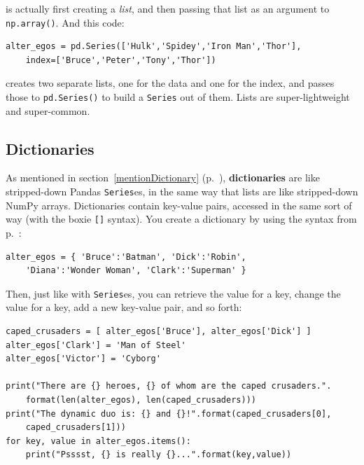 is actually first creating a \textit{list}, and then passing that list as an
argument to \texttt{np.array()}. And this code:


\begin{Verbatim}[fontsize=\footnotesize,samepage=true,frame=single,framesep=3mm]
alter_egos = pd.Series(['Hulk','Spidey','Iron Man','Thor'],
    index=['Bruce','Peter','Tony','Thor'])
\end{Verbatim}

creates two separate lists, one for the data and one for the index, and passes
those to \texttt{pd.Series()} to build a \texttt{Series} out of them. Lists are
super-lightweight and super-common.

\subsection{Dictionaries}


As mentioned in section~\ref{mentionDictionary}
(p.~\pageref{mentionDictionary}), \textbf{dictionaries} are like stripped-down
Pandas \texttt{Series}es, in the same way that lists are like stripped-down
NumPy arrays. Dictionaries contain key-value pairs, accessed in the same sort
of way (with the boxie \texttt{[]} syntax). You create a dictionary by
using the syntax from p.~\pageref{mentionDictionary2}:


\begin{Verbatim}[fontsize=\small,samepage=true,frame=single,framesep=3mm]
alter_egos = { 'Bruce':'Batman', 'Dick':'Robin',
    'Diana':'Wonder Woman', 'Clark':'Superman' }
\end{Verbatim}

Then, just like with \texttt{Series}es, you can retrieve the value for a key,
change the value for a key, add a new key-value pair, and so forth:


\begin{Verbatim}[fontsize=\footnotesize,samepage=true,frame=single,framesep=2mm]
caped_crusaders = [ alter_egos['Bruce'], alter_egos['Dick'] ]
alter_egos['Clark'] = 'Man of Steel'
alter_egos['Victor'] = 'Cyborg'

print("There are {} heroes, {} of whom are the caped crusaders.".
    format(len(alter_egos), len(caped_crusaders)))
print("The dynamic duo is: {} and {}!".format(caped_crusaders[0],
    caped_crusaders[1]))
for key, value in alter_egos.items():
    print("Psssst, {} is really {}...".format(key,value))
\end{Verbatim}
\vspace{-.2in}

